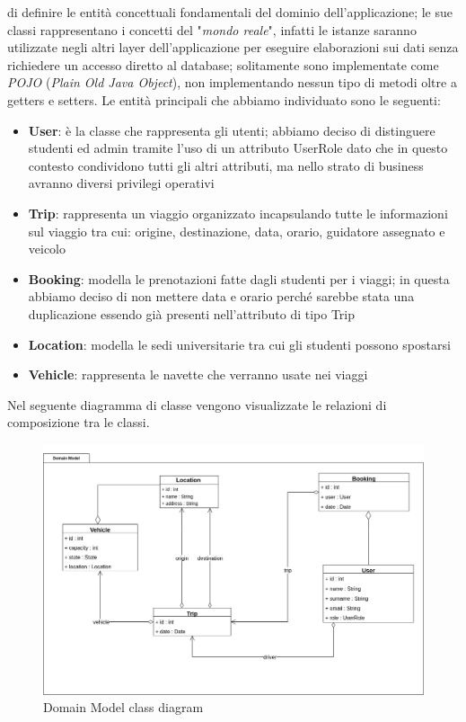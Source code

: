  di definire le entità concettuali fondamentali del dominio dell'applicazione; le sue classi rappresentano i concetti del "\textit{mondo reale}", infatti le istanze saranno utilizzate negli altri layer dell'applicazione per eseguire elaborazioni sui dati senza richiedere un accesso diretto al database; solitamente sono implementate come \textit{POJO} (\textit{Plain Old Java Object}), non implementando nessun tipo di metodi oltre a getters e setters.
Le entità principali che abbiamo individuato sono le seguenti:
\begin{itemize}
    \item \textbf{User}: è la classe che rappresenta gli utenti; abbiamo deciso di distinguere studenti ed admin tramite l'uso di un attributo UserRole dato che in questo contesto condividono  tutti gli altri attributi, ma nello strato di business avranno diversi privilegi operativi
    \item \textbf{Trip}: rappresenta un viaggio organizzato incapsulando tutte le informazioni sul viaggio tra cui: origine, destinazione, data, orario, guidatore assegnato e veicolo
    \item \textbf{Booking}: modella le prenotazioni fatte dagli studenti per i viaggi; in questa abbiamo deciso di non mettere data e orario perché sarebbe stata una duplicazione essendo già presenti nell'attributo di tipo Trip
    \item \textbf{Location}: modella le sedi universitarie tra cui gli studenti possono spostarsi
    \item \textbf{Vehicle}: rappresenta le navette che verranno usate nei viaggi
\end{itemize}
Nel seguente diagramma di classe vengono visualizzate le relazioni di composizione tra le classi.
\begin{figure}[H]
    \centering
    \includegraphics[width=1.2\linewidth]{Images/DomainModel_diag.png}
    \caption{Domain Model class diagram}
    \label{fig:DMdiag}
\end{figure}
